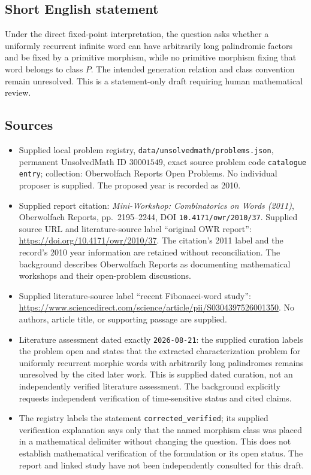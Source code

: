 \documentclass[11pt]{article}
\begin{document}
\subsection{Short English statement}
Under the direct fixed-point interpretation, the question asks whether a uniformly recurrent infinite word can have arbitrarily long palindromic factors and be fixed by a primitive morphism, while no primitive morphism fixing that word belongs to class \(P\). The intended generation relation and class convention remain unresolved. This is a statement-only draft requiring human mathematical review.
\subsection{Sources}
\begin{itemize}
\item Supplied local problem registry, \texttt{data/unsolvedmath/problems.json}, permanent UnsolvedMath ID \(30001549\), exact source problem code \texttt{catalogue entry}; collection: Oberwolfach Reports Open Problems. No individual proposer is supplied. The proposed year is recorded as 2010.
\item Supplied report citation: \emph{Mini-Workshop: Combinatorics on Words (2011)}, Oberwolfach Reports, pp.~2195--2244, DOI \texttt{10.4171/owr/2010/37}. Supplied source URL and literature-source label ``original OWR report'': \url{https://doi.org/10.4171/owr/2010/37}. The citation's 2011 label and the record's 2010 year information are retained without reconciliation. The background describes Oberwolfach Reports as documenting mathematical workshops and their open-problem discussions.
\item Supplied literature-source label ``recent Fibonacci-word study'': \url{https://www.sciencedirect.com/science/article/pii/S0304397526001350}. No authors, article title, or supporting passage are supplied.
\item Literature assessment dated exactly \texttt{2026-08-21}: the supplied curation labels the problem open and states that the extracted characterization problem for uniformly recurrent morphic words with arbitrarily long palindromes remains unresolved by the cited later work. This is supplied dated curation, not an independently verified literature assessment. The background explicitly requests independent verification of time-sensitive status and cited claims.
\item The registry labels the statement \texttt{corrected\_verified}; its supplied verification explanation says only that the named morphism class was placed in a mathematical delimiter without changing the question. This does not establish mathematical verification of the formulation or its open status. The report and linked study have not been independently consulted for this draft.
\end{itemize}
\end{document}
